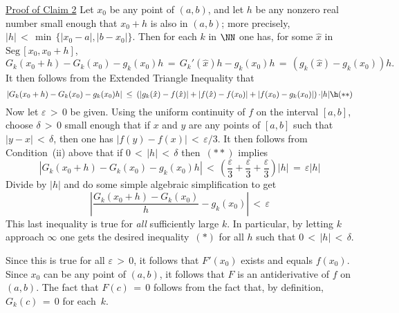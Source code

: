 {\V

        \underline{Proof of Claim 2} Let $x_{0}$ be any point of $(a,b)$, and let $h$ be any nonzero real number small enough that $x_{0}+h$ is also in $(a,b)$; more precisely, $|h|\,<\,{\min}\,\{|x_{0}-a|,|b-x_{0}|\}$.
    Then for each $k$ in ${\NN}$ one has, for some $\hat{x}$ in $\mbox{Seg}\,[x_{0}, x_{0}+h]$,
        \begin{displaymath}
        G_{k}(x_{0}+h) - G_{k}(x_{0}) - g_{k}(x_{0})h \,=\, G_{k}'(\hat{x})h - g_{k}(x_{0})h \,=\, (g_{k}(\hat{x}) - g_{k}(x_{0}))h.
        \end{displaymath}
    It then follows from the Extended Triangle Inequality that
        \begin{displaymath}
        \left|G_{k}(x_{0}+h) - G_{k}(x_{0}) - g_{k}(x_{0})h\right| 
    \,\,{\leq}\,\,\left(\left|g_{k}(\hat{x}) - f(\hat{x})\right| +|f(\hat{x}) - f(x_{0})| + \left|f(x_{0}) - g_{k}(x_{0})\right|\right){\cdot}|h| \h ({\ast}{\ast})
        \end{displaymath}
    Now let ${\varepsilon}\,>\,0$ be given. Using the uniform continuity of $f$ on the interval $[a,b]$, choose ${\delta}\,>\,0$ small enough that if $x$ and $y$ are any points of $[a,b]$ such that 
    $|y-x|\,<\,{\delta}$, then one has $|f(y)-f(x)|\,<\,{\varepsilon}/3$.
    It then follows from Condition~(ii) above that if $0\,<\,|h|\,<\,{\delta}$ then~$({\ast}{\ast})$ implies
        \begin{displaymath}
        \left|G_{k}(x_{0}+h) - G_{k}(x_{0}) - g_{k}(x_{0})h\right| \,<\,\left(\frac{{\varepsilon}}{3} + \frac{{\varepsilon}}{3} + \frac{{\varepsilon}}{3}\right)|h| \,=\, {\varepsilon}|h|
        \end{displaymath}
    Divide by $|h|$ and do some simple algebraic simplification to get
        \begin{displaymath}
        \left|\frac{G_{k}(x_{0}+h) - G_{k}(x_{0})}{h} - g_{k}(x_{0})\right|\,<\,{\varepsilon}
        \end{displaymath}
    This last inequality is true for {\em all} sufficiently large $k$. In particular,
    by letting $k$ approach ${\infty}$ one gets the desired inequality~$({\ast})$ for all $h$ such that $0\,<\,|h|\,<\,{\delta}$.

    Since this is true for all ${\varepsilon}\,>\,0$, it follows that $F'(x_{0})$ exists and equals $f(x_{0})$.
    Since $x_{0}$ can be any point of $(a,b)$, it follows that $F$ is an antiderivative of $f$ on $(a,b)$.
    The fact that $F(c) \,=\, 0$ follows from the fact that, by definition, $G_{k}(c) \,=\, 0$ for each~$k$.

}
